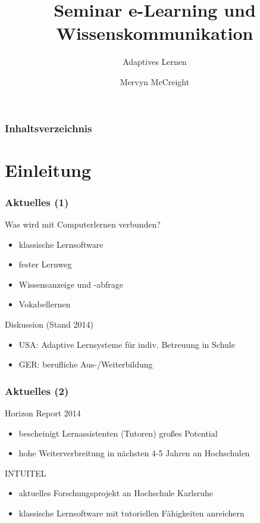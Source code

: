 \documentclass{beamer}
\title[Seminar]{Seminar e-Learning und Wissenskommunikation}
\subtitle[Remailer]{Adaptives Lernen}
\author[M. McCreight]{Mervyn McCreight}
\institute[FH-Wedel]{FH-Wedel}
\begin{document}
  \usetikzlibrary{positioning}
  \usetikzlibrary{shapes}
  \usetikzlibrary{arrows,automata}


\frame{\titlepage}

\begin{frame}
	\frametitle{Inhaltsverzeichnis}
	\tableofcontents
\end{frame}

\section{Einleitung}
\begin{frame}
  \frametitle{Aktuelles (1)}

  \begin{block}{Was wird mit Computerlernen verbunden?}
    \begin{itemize}
      \item klassische Lernsoftware
      \item fester Lernweg
      \item Wissensanzeige und -abfrage
      \item Vokabellernen
    \end{itemize}
  \end{block}

  \begin{block}{Diskussion (Stand 2014)}
    \begin{itemize}
      \item USA: Adaptive Lernsysteme für indiv. Betreuung in Schule
      \item GER: berufliche Aus-/Weiterbildung
    \end{itemize}
  \end{block}
\end{frame}

\begin{frame}
  \frametitle{Aktuelles (2)}

  \begin{block}{Horizon Report 2014}
    \begin{itemize}
      \item bescheinigt Lernassistenten (Tutoren) großes Potential
      \item hohe Weiterverbreitung in nächsten 4-5 Jahren an Hochschulen
    \end{itemize}
  \end{block}

  \begin{block}{INTUITEL}
    \begin{itemize}
      \item aktuelles Forschungsprojekt an Hochschule Karlsruhe
      \item klassische Lernsoftware mit tutoriellen Fähigkeiten anreichern
    \end{itemize}
  \end{block}
\end{frame}
\end{document}
